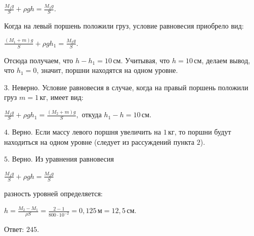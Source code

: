 \documentclass[12pt,a4paper]{article}
\begin{document}
{$\frac{ M_{1}g}{ S } + \rho gh= \frac{ M_{2}g}{ S } .$

Когда на левый поршень положили груз, условие равновесия приобрело вид:

$\frac{ ( M_{1} + m ) g}{ S } + \rho gh_{1}= \frac{ M_{2}g}{ S } .$

Отсюда получаем, что $h - h_{1}=10\,\text{см}.$ Учитывая, что $h=10 \,\text{см}$, делаем вывод, что $h_{1}=0$, значит, поршни находятся на одном уровне.
\par\smallskip\noindent $3$. Неверно. Условие равновесия в случае, когда на правый поршень положили груз $m=1 \,\text{кг}$, имеет вид:

$\frac{ M_{1}g}{ S } + \rho gh_{1}= \frac{ ( M_{2} + m ) g}{ S } ,$
 откуда $h_1-h=10\,\text{см}$.
\par\smallskip\noindent $4$. Верно. Если массу левого поршня увеличить на $1 \,\text{кг}$, то поршни будут находиться на одном уровне (следует из рассуждений пункта $2$).
\par\smallskip\noindent $5$. Верно. Из уравнения равновесия 

$\frac{ M_{1}g}{ S } + \rho gh= \frac{ M_{2}g}{ S }$
 
разность уровней определяется:

$h= \frac{ M_{2} - M_{1}}{ \rho S } = \frac{ 2 - 1}{ 800 \cdot 10 ^{ - 2 } } =0{,}125\,\text{м} =12{,}5\,\text{см}.$

Ответ: $245$.
}
\end{document}
